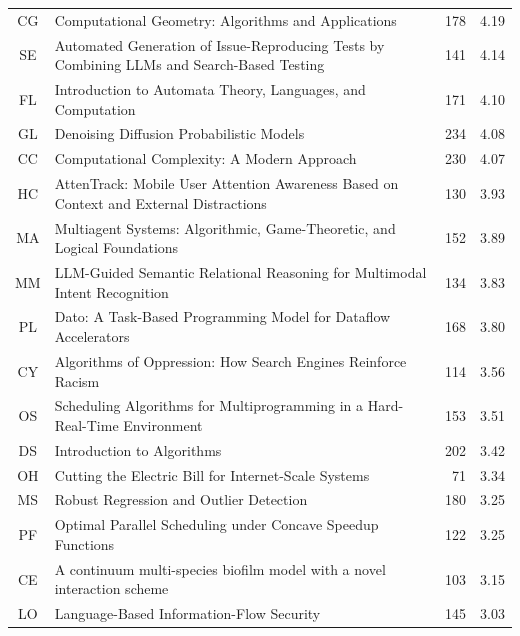 \begin{table}[t]
\begin{threeparttable}
\begin{tabular}{clrc}
CG & Computational Geometry: Algorithms and Applications & \cellcolor{green!16}178 & \cellcolor{green!16}4.19 \\
SE & Automated Generation of Issue-Reproducing Tests by Combining LLMs and Search-Based Testing & \cellcolor{green!16}141 & \cellcolor{green!16}4.14 \\
FL & Introduction to Automata Theory, Languages, and Computation & \cellcolor{green!16}171 & \cellcolor{green!16}4.10 \\
GL & Denoising Diffusion Probabilistic Models & \cellcolor{green!16}234 & \cellcolor{green!16}4.08 \\
CC & Computational Complexity: A Modern Approach & \cellcolor{green!16}230 & \cellcolor{green!16}4.07 \\
HC & AttenTrack: Mobile User Attention Awareness Based on Context and External Distractions & \cellcolor{green!12}130 & \cellcolor{green!12}3.93 \\
MA & Multiagent Systems: Algorithmic, Game-Theoretic, and Logical Foundations & \cellcolor{green!12}152 & \cellcolor{green!12}3.89 \\
MM & LLM-Guided Semantic Relational Reasoning for Multimodal Intent Recognition & \cellcolor{green!12}134 & \cellcolor{green!12}3.83 \\
PL & Dato: A Task-Based Programming Model for Dataflow Accelerators & \cellcolor{green!12}168 & \cellcolor{green!12}3.80 \\
CY & Algorithms of Oppression: How Search Engines Reinforce Racism & \cellcolor{green!12}114 & \cellcolor{green!12}3.56 \\
OS & Scheduling Algorithms for Multiprogramming in a Hard-Real-Time Environment & \cellcolor{green!12}153 & \cellcolor{green!12}3.51 \\
DS & Introduction to Algorithms & \cellcolor{green!12}202 & \cellcolor{green!12}3.42 \\
OH & Cutting the Electric Bill for Internet-Scale Systems & \cellcolor{green!12}71 & \cellcolor{green!12}3.34 \\
MS & Robust Regression and Outlier Detection & \cellcolor{green!12}180 & \cellcolor{green!12}3.25 \\
PF & Optimal Parallel Scheduling under Concave Speedup Functions & \cellcolor{green!12}122 & \cellcolor{green!12}3.25 \\
CE & A continuum multi-species biofilm model with a novel interaction scheme & \cellcolor{green!12}103 & \cellcolor{green!12}3.15 \\
LO & Language-Based Information-Flow Security & \cellcolor{green!12}145 & \cellcolor{green!12}3.03 \\

\end{tabular}
\end{threeparttable}
\end{table}
